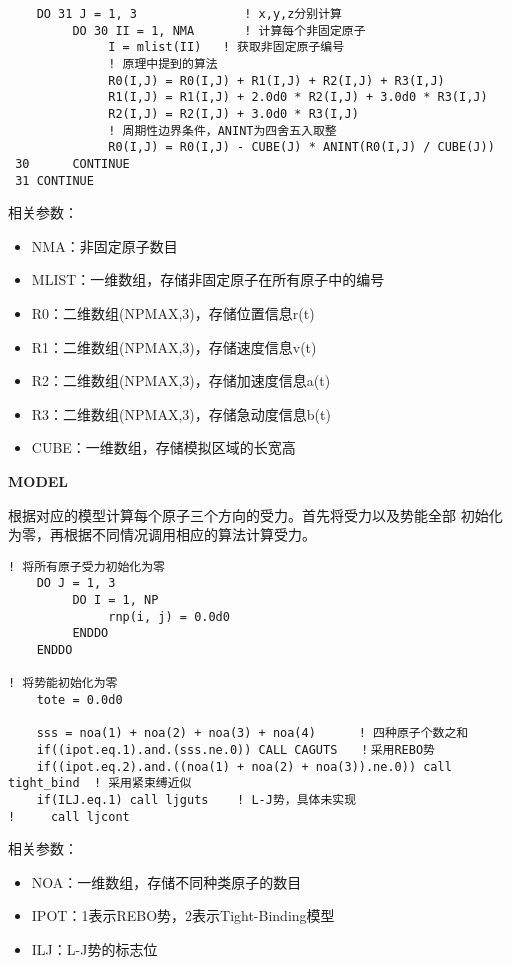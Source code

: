 \documentclass[UTF-8]{ctexart}
\begin{document}
\begin{verbatim}
    DO 31 J = 1, 3               ! x,y,z分别计算
         DO 30 II = 1, NMA       ! 计算每个非固定原子
              I = mlist(II)   ! 获取非固定原子编号
              ! 原理中提到的算法
              R0(I,J) = R0(I,J) + R1(I,J) + R2(I,J) + R3(I,J)
              R1(I,J) = R1(I,J) + 2.0d0 * R2(I,J) + 3.0d0 * R3(I,J)
              R2(I,J) = R2(I,J) + 3.0d0 * R3(I,J)
              ! 周期性边界条件，ANINT为四舍五入取整
              R0(I,J) = R0(I,J) - CUBE(J) * ANINT(R0(I,J) / CUBE(J))
 30      CONTINUE
 31 CONTINUE
\end{verbatim}

\noindent
相关参数：
\begin{itemize}
    \item NMA：非固定原子数目
    \item MLIST：一维数组，存储非固定原子在所有原子中的编号
    \item R0：二维数组(NPMAX,3)，存储位置信息r(t)
    \item R1：二维数组(NPMAX,3)，存储速度信息v(t)
    \item R2：二维数组(NPMAX,3)，存储加速度信息a(t)
    \item R3：二维数组(NPMAX,3)，存储急动度信息b(t)
    \item CUBE：一维数组，存储模拟区域的长宽高
\end{itemize}

\noindent
\textbf{MODEL}

根据对应的模型计算每个原子三个方向的受力。首先将受力以及势能全部
初始化为零，再根据不同情况调用相应的算法计算受力。

\begin{verbatim}
! 将所有原子受力初始化为零 
    DO J = 1, 3
         DO I = 1, NP
              rnp(i, j) = 0.0d0
         ENDDO
    ENDDO

! 将势能初始化为零
    tote = 0.0d0

    sss = noa(1) + noa(2) + noa(3) + noa(4)      ! 四种原子个数之和
    if((ipot.eq.1).and.(sss.ne.0)) CALL CAGUTS   ！采用REBO势
    if((ipot.eq.2).and.((noa(1) + noa(2) + noa(3)).ne.0)) call tight_bind  ! 采用紧束缚近似
    if(ILJ.eq.1) call ljguts    ! L-J势，具体未实现
!     call ljcont
\end{verbatim}

\noindent
相关参数：
\begin{itemize}
    \item NOA：一维数组，存储不同种类原子的数目
    \item IPOT：1表示REBO势，2表示Tight-Binding模型
    \item ILJ：L-J势的标志位
\end{itemize}
\end{document}
